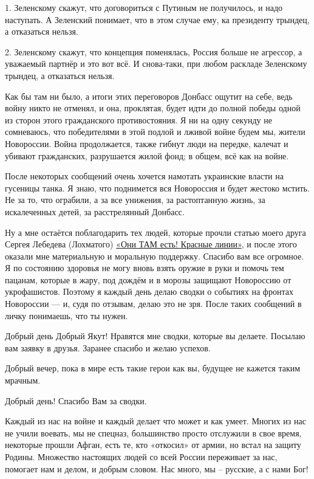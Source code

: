 1. Зеленскому скажут, что договориться с Путиным не получилось, и надо
наступать. А Зеленский понимает, что в этом случае ему, ка президенту трындец,
а отказаться нельзя.

2. Зеленскому скажут, что концепция поменялась, Россия больше не агрессор, а
уважаемый партнёр и это вот всё. И снова-таки, при любом раскладе Зеленскому
трындец, а отказаться нельзя. 

Как бы там ни было, а итоги этих переговоров Донбасс ощутит на себе, ведь войну
никто не отменял, и она, проклятая, будет идти до полной победы одной из сторон
этого гражданского противостояния. Я ни на одну секунду не сомневаюсь, что
победителями в этой подлой и лживой войне будем мы, жители Новороссии. Война
продолжается, также гибнут люди на передке, калечат и убивают гражданских,
разрушается жилой фонд; в общем, всё как на войне. 

После некоторых сообщений очень хочется намотать украинские власти на гусеницы
танка. Я знаю, что поднимется вся Новороссия и будет жестоко мстить. Не за то,
что ограбили, а за все унижения, за растоптанную жизнь, за искалеченных детей,
за расстрелянный Донбасс. 

Ну а мне остаётся поблагодарить тех людей, которые прочли статью моего друга
Сергея Лебедева (Лохматого)
\href{https://voskhodinfo.su/okazat-pomosch-lyudyam/pomosch-semyam/73136-oni-tam-est-krasnye-linii.html}{«Они %
ТАМ есть! Красные линии»}, и после этого оказали мне материальную и моральную
поддержку. Спасибо вам все огромное. Я по состоянию здоровья не могу вновь
взять оружие в руки и помочь тем пацанам, которые в жару, под дождём и в морозы
защищают Новороссию от укрофашистов.  Поэтому я каждый день делаю сводки о
событиях на фронтах Новороссии — и, судя по отзывам, делаю это не зря. После
таких сообщений в личку понимаешь, что ты нужен. 

\begin{zznagolos}
	
Добрый день Добрый Якут! Нравятся мне сводки, которые вы делаете. Посылаю вам
заявку в друзья. Заранее спасибо и желаю успехов.

Добрый вечер, пока в мире есть такие герои как вы, будущее не кажется таким
мрачным.

Добрый день! Спасибо Вам за сводки.
\end{zznagolos}

Каждый из нас на войне и каждый делает что может и как умеет. Многих из нас не
учили воевать, мы не спецназ, большинство просто отслужили в свое время,
некоторые прошли Афган, есть те, кто «откосил» от армии, но встал на защиту
Родины. Множество настоящих людей со всей России переживает за нас, помогает
нам и делом, и добрым словом. Нас много, мы – русские, а с нами Бог!

